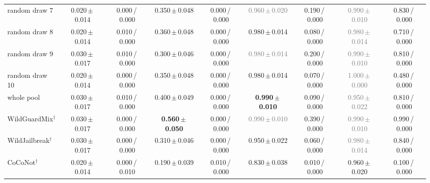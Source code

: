 \begin{tabular}{@{}lcccccccc@{}}
random draw 7 & 0.020\,{\scriptsize$\pm$\,0.014} & {\scriptsize 0.000\,/\,0.000} & 0.350\,{\scriptsize$\pm$\,0.048} & {\scriptsize 0.000\,/\,0.000} & \textcolor{gray}{0.960\,{\scriptsize$\pm$\,0.020}} & {\scriptsize 0.190\,/\,0.000} & \textcolor{gray}{0.990\,{\scriptsize$\pm$\,0.010}} & {\scriptsize 0.830\,/\,0.000} \\
random draw 8 & 0.020\,{\scriptsize$\pm$\,0.014} & {\scriptsize 0.010\,/\,0.000} & 0.360\,{\scriptsize$\pm$\,0.048} & {\scriptsize 0.000\,/\,0.000} & 0.980\,{\scriptsize$\pm$\,0.014} & {\scriptsize 0.080\,/\,0.000} & \textcolor{gray}{0.980\,{\scriptsize$\pm$\,0.014}} & {\scriptsize 0.710\,/\,0.000} \\
random draw 9 & 0.030\,{\scriptsize$\pm$\,0.017} & {\scriptsize 0.010\,/\,0.000} & 0.300\,{\scriptsize$\pm$\,0.046} & {\scriptsize 0.000\,/\,0.000} & \textcolor{gray}{0.980\,{\scriptsize$\pm$\,0.014}} & {\scriptsize 0.200\,/\,0.000} & \textcolor{gray}{0.990\,{\scriptsize$\pm$\,0.010}} & {\scriptsize 0.810\,/\,0.000} \\
random draw 10 & 0.020\,{\scriptsize$\pm$\,0.014} & {\scriptsize 0.000\,/\,0.000} & 0.350\,{\scriptsize$\pm$\,0.048} & {\scriptsize 0.000\,/\,0.000} & 0.980\,{\scriptsize$\pm$\,0.014} & {\scriptsize 0.070\,/\,0.000} & \textcolor{gray}{1.000\,{\scriptsize$\pm$\,0.000}} & {\scriptsize 0.480\,/\,0.000} \\
whole pool & 0.030\,{\scriptsize$\pm$\,0.017} & {\scriptsize 0.010\,/\,0.000} & 0.400\,{\scriptsize$\pm$\,0.049} & {\scriptsize 0.000\,/\,0.000} & \textbf{0.990\,{\scriptsize$\pm$\,0.010}} & {\scriptsize 0.090\,/\,0.000} & \textcolor{gray}{0.950\,{\scriptsize$\pm$\,0.022}} & {\scriptsize 0.810\,/\,0.000} \\
WildGuardMix$^\dagger$ & 0.030\,{\scriptsize$\pm$\,0.017} & {\scriptsize 0.000\,/\,0.000} & \textbf{0.560\,{\scriptsize$\pm$\,0.050}} & {\scriptsize 0.000\,/\,0.000} & \textcolor{gray}{0.990\,{\scriptsize$\pm$\,0.010}} & {\scriptsize 0.390\,/\,0.000} & \textcolor{gray}{0.990\,{\scriptsize$\pm$\,0.010}} & {\scriptsize 0.990\,/\,0.000} \\
WildJailbreak$^\dagger$ & 0.030\,{\scriptsize$\pm$\,0.017} & {\scriptsize 0.000\,/\,0.000} & 0.310\,{\scriptsize$\pm$\,0.046} & {\scriptsize 0.000\,/\,0.000} & 0.950\,{\scriptsize$\pm$\,0.022} & {\scriptsize 0.060\,/\,0.000} & \textcolor{gray}{0.980\,{\scriptsize$\pm$\,0.014}} & {\scriptsize 0.840\,/\,0.000} \\
CoCoNot$^\dagger$ & 0.020\,{\scriptsize$\pm$\,0.014} & {\scriptsize 0.000\,/\,0.010} & 0.190\,{\scriptsize$\pm$\,0.039} & {\scriptsize 0.010\,/\,0.000} & 0.830\,{\scriptsize$\pm$\,0.038} & {\scriptsize 0.010\,/\,0.000} & 0.960\,{\scriptsize$\pm$\,0.020} & {\scriptsize 0.100\,/\,0.000} \\

\end{tabular}
